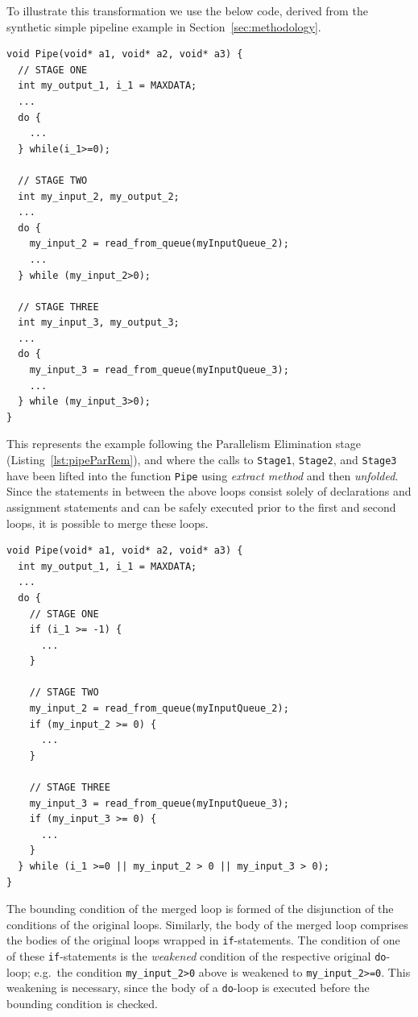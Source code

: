 To illustrate this transformation we use the below code, derived from the synthetic simple pipeline example in Section~\ref{sec:methodology}.
%
\begin{lstlisting}[caption=Intermediate Code Repair Stage for Simple Pipeline Example, label=lst:refac:repair:before, frame=single]
void Pipe(void* a1, void* a2, void* a3) {
  // STAGE ONE
  int my_output_1, i_1 = MAXDATA;
  ...
  do {
    ...
  } while(i_1>=0);

  // STAGE TWO
  int my_input_2, my_output_2;
  ...
  do {
    my_input_2 = read_from_queue(myInputQueue_2);
    ...
  } while (my_input_2>0);

  // STAGE THREE
  int my_input_3, my_output_3;
  ...
  do {
    my_input_3 = read_from_queue(myInputQueue_3);
    ...
  } while (my_input_3>0);
}
\end{lstlisting}
%
\noindent
This represents the example following the Parallelism Elimination stage (Listing~\ref{lst:pipeParRem}), and where the calls to \lstinline|Stage1|, \lstinline|Stage2|, and \lstinline|Stage3| have been lifted into the function \lstinline|Pipe| using \emph{extract method} and then \emph{unfolded}. Since the statements in between the above loops consist solely of declarations and assignment statements and can be safely executed prior to the first and second loops, it is possible to merge these loops.
%
\begin{lstlisting}[caption=Following Merging of loops in Listing~\ref{lst:refac:repair:before}), label=lst:refac:repair:after, frame=single]
void Pipe(void* a1, void* a2, void* a3) {
  int my_output_1, i_1 = MAXDATA;
  ...
  do {
    // STAGE ONE
    if (i_1 >= -1) {
      ...
    }

    // STAGE TWO
    my_input_2 = read_from_queue(myInputQueue_2);
    if (my_input_2 >= 0) {
      ...
    }

    // STAGE THREE
    my_input_3 = read_from_queue(myInputQueue_3);
    if (my_input_3 >= 0) {
      ...
    }
  } while (i_1 >=0 || my_input_2 > 0 || my_input_3 > 0);
}
\end{lstlisting}
%
The bounding condition of the merged loop is formed of the disjunction of the conditions of the original loops. Similarly, the body of the merged loop comprises the bodies of the original loops wrapped in \lstinline{if}-statements. The condition of one of these \lstinline{if}-statements is the \emph{weakened} condition of the respective original \lstinline{do}-loop; e.g.\ the condition \lstinline|my_input_2>0| above is weakened to \lstinline|my_input_2>=0|. This weakening is necessary, since the body of a \lstinline{do}-loop is executed before the bounding condition is checked.
